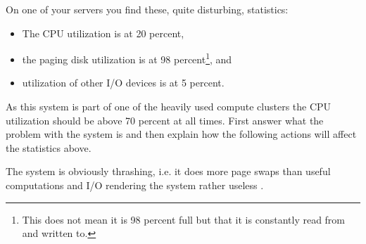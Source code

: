 \documentclass[a4paper]{miunasgn}
\theoremstyle{definition}
\begin{document}
\begin{questions}
	\question\label{q:thrashing}
	On one of your servers you find these, quite disturbing, statistics:
	\begin{itemize}
		\item The CPU utilization is at 20 percent,
		\item the paging disk utilization is at 98 percent\footnote{%
				This does not mean it is 98 percent full but that it is constantly read 
				from and written to.
			}, and
		\item utilization of other I/O devices is at 5 percent.
	\end{itemize}
	As this system is part of one of the heavily used compute clusters the CPU 
	utilization should be above 70 percent at all times.
	First answer what the problem with the system is and then explain how the 
	following actions will affect the statistics above.
	\begin{solution}
		The system is obviously thrashing, i.e. it does more page swaps than useful 
		computations and I/O rendering the system rather useless \citep[p.  
		386]{Silberschatz2009osc}.


\end{solution}
\end{questions}
\end{document}
